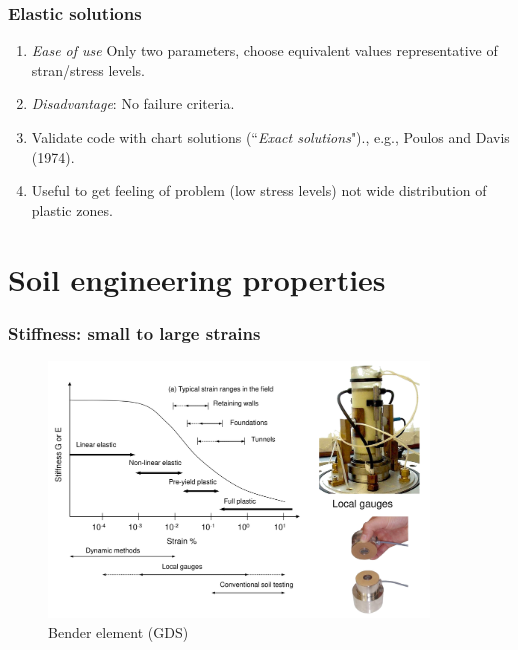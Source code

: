\documentclass[notes]{beamer}
\begin{document}
\begin{frame}
\frametitle{Elastic solutions}
	\begin{enumerate}
		\item \textit{Ease of use} Only two parameters, choose equivalent values representative of stran/stress levels.
		\item \textit{Disadvantage}: No failure criteria.
		\item Validate code with chart solutions (``\textit{Exact solutions}")., e.g., Poulos and Davis (1974).
		\item Useful to get feeling of problem (low stress levels) not wide distribution of plastic zones.
	\end{enumerate}
\end{frame}


\section{Soil engineering properties}
\begin{frame}
	\frametitle{Stiffness: small to large strains}
	\begin{figure}
		\includegraphics[width=0.9\textwidth]{figs/stiffness-strains.png}
		\caption*{Bender element (GDS)}
	\end{figure}
\end{frame}
\end{document}
